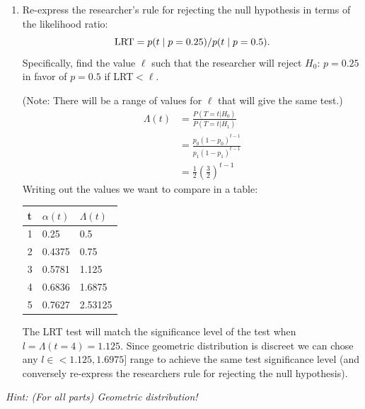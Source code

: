 \documentclass{article}
\newcommand{\1}{\mathbf{1}}
\begin{document}
\begin{enumerate}
    \newpage
    \item  Re-express the researcher's rule for rejecting the null hypothesis in terms of the likelihood ratio:
    $$ {\rm LRT} = p(t \mid p=0.25)/p(t \mid p=0.5). $$
    Specifically, find the value $\ell$ such that the researcher will reject $H_0$: $p=0.25$ in favor of $p=0.5$ if LRT$<\ell$.\par  {(Note: There will be a range of values for $\ell$ that will give the same test.)}
    \begin{align*}
        \Lambda (t) &= \frac{P(T=t|H_0)}{P(T=t|H_1)} \\
        &= \frac{p_0(1-p_0)^{t-1}}{p_1(1-p_1)^{t-1}} \\
        &= \frac{1}{2}\left(\frac{3}{2}\right)^{t-1}
    \end{align*}
    Writing out the values we want to compare in a table:
    \begin{table}[h!]
        \centering
        \begin{tabular}{l|l|l}
        t & $\alpha(t)$ & $\Lambda(t)$ \\ \hline 
        1 & 0.25                             & 0.5                           \\
        2 & 0.4375                           & 0.75                           \\
        3 & {\color{blue} 0.5781}            & 1.125                          \\
        4 & 0.6836                           & 1.6875                         \\
        5 & 0.7627                           & 2.53125                        \\
        \end{tabular}
    \end{table}
    
    The LRT test will match the significance level of the test when $l = \Lambda(t=4)=1.125$. Since geometric distribution is discreet we can chose any $l\in <1.125, 1.6975]$ range to achieve the same test significance level (and conversely re-express the researchers rule for rejecting the null hypothesis). 
    
\end{enumerate}
{\it Hint: (For all parts) Geometric distribution!}


\newpage
\end{document}
